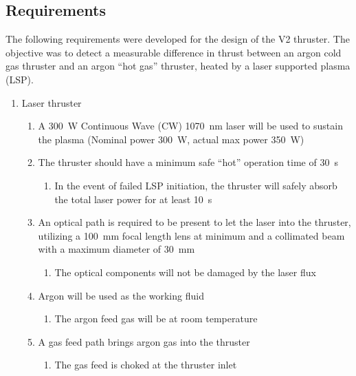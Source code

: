         \subsection{Requirements}

            The following requirements were developed for the design of the V2 thruster. The objective was to detect a measurable difference in thrust between an argon cold gas thruster and an argon “hot gas” thruster, heated by a laser supported plasma (LSP).

            \begin{enumerate}
                \item Laser thruster
                \begin{enumerate}
                    \item A \qty{300}{W} Continuous Wave (CW) \qty{1070}{nm} laser will be used to sustain the plasma (Nominal power \qty{300}{W}, actual max power \qty{350}{W})
                    \item The thruster should have a minimum safe “hot” operation time of \qty{30}{s}
                    \begin{enumerate}
                        \item In the event of failed LSP initiation, the thruster will safely absorb the total laser power for at least \qty{10}{s}
                    \end{enumerate}
                    \item An optical path is required to be present to let the laser into the thruster, utilizing a \qty{100}{mm} focal length lens at minimum and a collimated beam with a maximum diameter of \qty{30}{mm}
                    \begin{enumerate}
                        \item The optical components will not be damaged by the laser flux
                    \end{enumerate}
                    \item Argon will be used as the working fluid
                    \begin{enumerate}
                        \item The argon feed gas will be at room temperature
                    \end{enumerate}
                    \item A gas feed path brings argon gas into the thruster
                    \begin{enumerate}
                        \item The gas feed is choked at the thruster inlet

\end{enumerate}
\end{enumerate}
\end{enumerate}
